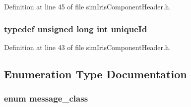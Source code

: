 Definition at line 45 of file simIrisComponentHeader.h.
\subsubsection[{uniqueId}]{\setlength{\rightskip}{0pt plus 5cm}typedef unsigned long int {\bf uniqueId}}\label{simIrisComponentHeader_8h_880960a57c549f69d77cf01237366978}




Definition at line 43 of file simIrisComponentHeader.h.

\subsection{Enumeration Type Documentation}
\subsubsection[{message\_\-class}]{\setlength{\rightskip}{0pt plus 5cm}enum {\bf message\_\-class}}\label{simIrisComponentHeader_8h_155eefa40b3e6db305cb151f7bb6bef4}


